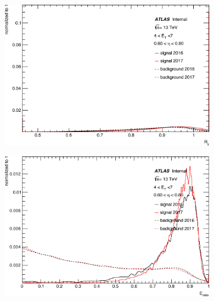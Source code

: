 \begin{figure}[t]\ContinuedFloat
\centering
  \begin{subfigure}[b]{0.49\textwidth}
    \centering
    \includegraphics[width=1.0\textwidth]{figs/egamma/trig_rphi_lowet.png} 
    \label{fig:egamma:trig_rph_lowet}
  \end{subfigure}
  \hfill
  \begin{subfigure}[b]{0.49\textwidth}
    \centering
    \includegraphics[width=1.0\textwidth]{figs/egamma/trig_eratio_lowEt.png} 
    \label{fig:egamma:trig_eratio_lowet}
  \end{subfigure}
  \hfill
  \begin{subfigure}[b]{0.49\textwidth}
    \centering

\end{subfigure}
\end{figure}
